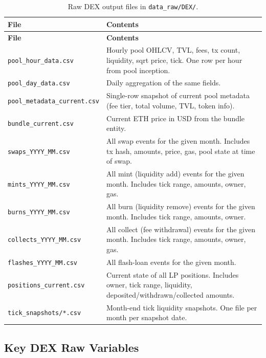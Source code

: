 \documentclass[11pt,a4paper]{article}
\begin{document}
\begin{longtable}{L{5.5cm}L{8.9cm}}
\caption{Raw DEX output files in \texttt{data\_raw/DEX/}.}\\
\toprule
\textbf{File} & \textbf{Contents} \\
\midrule
\endfirsthead
\toprule
\textbf{File} & \textbf{Contents} \\
\midrule
\endhead
\bottomrule
\endfoot
\texttt{pool\_hour\_data.csv} & Hourly pool OHLCV, TVL, fees, tx count, liquidity, sqrt price, tick. One row per hour from pool inception. \\
\texttt{pool\_day\_data.csv} & Daily aggregation of the same fields. \\
\texttt{pool\_metadata\_current.csv} & Single-row snapshot of current pool metadata (fee tier, total volume, TVL, token info). \\
\texttt{bundle\_current.csv} & Current ETH price in USD from the bundle entity. \\
\texttt{swaps\_YYYY\_MM.csv} & All swap events for the given month. Includes tx hash, amounts, price, gas, pool state at time of swap. \\
\texttt{mints\_YYYY\_MM.csv} & All mint (liquidity add) events for the given month. Includes tick range, amounts, owner, gas. \\
\texttt{burns\_YYYY\_MM.csv} & All burn (liquidity remove) events for the given month. Includes tick range, amounts, owner. \\
\texttt{collects\_YYYY\_MM.csv} & All collect (fee withdrawal) events for the given month. Includes tick range, amounts, owner, gas. \\
\texttt{flashes\_YYYY\_MM.csv} & All flash-loan events for the given month. \\
\texttt{positions\_current.csv} & Current state of all LP positions. Includes owner, tick range, liquidity, deposited/withdrawn/collected amounts. \\
\texttt{tick\_snapshots/*.csv} & Month-end tick liquidity snapshots. One file per month per snapshot date. \\
\end{longtable}

\subsection{Key DEX Raw Variables}
\end{document}

